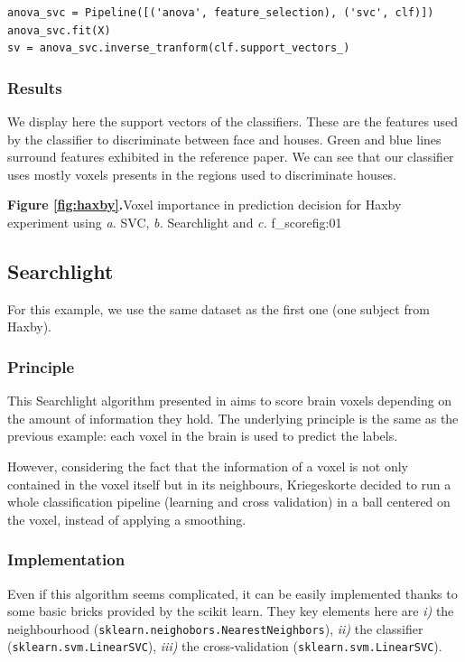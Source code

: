 \documentclass{frontiersSCNS} %
\begin{document}
\begin{lstlisting}
anova_svc = Pipeline([('anova', feature_selection), ('svc', clf)])
anova_svc.fit(X)
sv = anova_svc.inverse_tranform(clf.support_vectors_)
\end{lstlisting}

\subsubsection{Results}

We display here the support vectors of the classifiers. These are the features
used by the classifier to discriminate between face and houses. Green and blue
lines surround features exhibited in the reference paper. We can see that our
classifier uses mostly voxels presents in the regions used to discriminate
houses.

\textbf{Figure \ref{fig:haxby}.}{Voxel importance in prediction decision for Haxby experiment
using \textit{a.} SVC, \textit{b.} Searchlight and \textit{c.} f\_score}{fig:01}

\subsection{Searchlight}
\label{searchlight}
For this example, we use the same dataset as the first one (one subject from
Haxby).

\subsubsection{Principle}

This Searchlight algorithm presented in \cite{kriegeskorte2006} aims to score
brain voxels depending on the amount of information they hold. The underlying
principle is the same as the previous example: each voxel in the brain is used
to predict the labels.

However, considering the fact that the information of a voxel is not only
contained in the voxel itself but in its neighbours, Kriegeskorte decided to run
a whole classification pipeline (learning and cross validation) in a ball
centered on the voxel, instead of applying a smoothing.

\subsubsection{Implementation}

Even if this algorithm seems complicated, it can be easily implemented thanks to
some basic bricks provided by the scikit learn. They key elements here are
\textit{i)} the neighbourhood (\verb!sklearn.neighobors.NearestNeighbors!),
\textit{ii)} the classifier (\verb!sklearn.svm.LinearSVC!),
\textit{iii)} the cross-validation (\verb!sklearn.svm.LinearSVC!).
\end{document}
